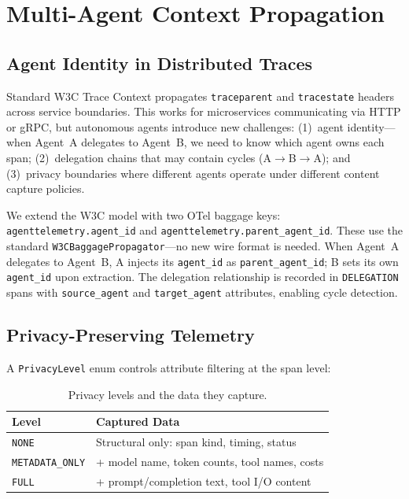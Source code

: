\documentclass[sigplan,10pt,screen]{acmart}
\begin{document}
\section{Multi-Agent Context Propagation}
\label{sec:propagation}

\subsection{Agent Identity in Distributed Traces}

Standard W3C Trace Context propagates \texttt{traceparent} and
\texttt{tracestate} headers across service boundaries.  This works for
microservices communicating via HTTP or gRPC, but autonomous agents
introduce new challenges: (1)~agent identity---when Agent~A delegates
to Agent~B, we need to know which agent owns each span; (2)~delegation
chains that may contain cycles (A$\to$B$\to$A); and (3)~privacy
boundaries where different agents operate under different content
capture policies.

We extend the W3C model with two OTel baggage keys:
\texttt{agenttelemetry.agent\_id} and
\texttt{agenttelemetry.parent\_agent\_id}.  These use the standard
\texttt{W3CBaggagePropagator}---no new wire format is needed.  When
Agent~A delegates to Agent~B, A injects its \texttt{agent\_id} as
\texttt{parent\_agent\_id}; B sets its own \texttt{agent\_id} upon
extraction.  The delegation relationship is recorded in
\texttt{DELEGATION} spans with \texttt{source\_agent} and
\texttt{target\_agent} attributes, enabling cycle detection.

\subsection{Privacy-Preserving Telemetry}

A \texttt{PrivacyLevel} enum controls attribute filtering at the span
level:

\begin{table}[t]
\centering
\small
\caption{Privacy levels and the data they capture.}
\label{tab:privacy}
\begin{tabular}{@{}lp{5.5cm}@{}}
\toprule
\textbf{Level} & \textbf{Captured Data} \\
\midrule
\texttt{NONE} & Structural only: span kind, timing, status \\
\texttt{METADATA\_ONLY} & + model name, token counts, tool names, costs \\
\texttt{FULL} & + prompt/completion text, tool I/O content \\
\bottomrule
\end{tabular}
\end{table}
\end{document}

